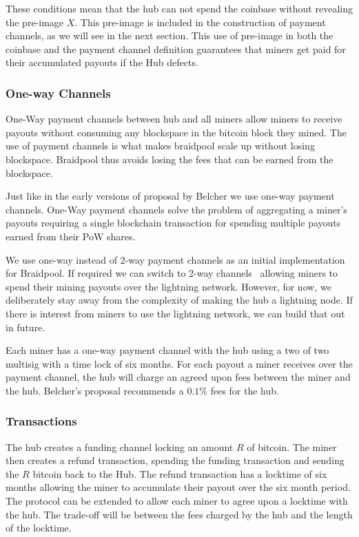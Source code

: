 \documentclass{article}
\begin{document}
These conditions mean that the hub can not spend the coinbase without
revealing the pre-image $X$. This pre-image is included in the
construction of payment channels, as we will see in the next
section. This use of pre-image in both the coinbase and the payment
channel definition guarantees that miners get paid for their
accumulated payouts if the Hub defects.

\subsubsection{One-way Channels}

One-Way payment channels between hub and all miners allow miners to
receive payouts without consuming any blockspace in the bitcoin block
they mined. The use of payment channels is what makes braidpool scale
up without losing blockspace. Braidpool thus avoids losing the fees
that can be earned from the blockspace.

Just like in the early versions of proposal by Belcher we use one-way
payment channels. One-Way payment channels solve the problem of
aggregating a miner's payouts requiring a single blockchain
transaction for spending multiple payouts earned from their PoW
shares.

We use one-way instead of 2-way payment channels as an initial
implementation for Braidpool. If required we can switch to 2-way
channels~\cite{poon2016bitcoin} allowing miners to spend their mining
payouts over the lightning network. However, for now, we deliberately
stay away from the complexity of making the hub a lightning node. If
there is interest from miners to use the lightning network, we can
build that out in future.

Each miner has a one-way payment channel with the hub using a two of
two multisig with a time lock of six months. For each payout a miner
receives over the payment channel, the hub will charge an agreed upon
fees between the miner and the hub. Belcher's proposal recommends a
$0.1\%$ fees for the hub.

\subsubsection{Transactions}

The hub creates a funding channel locking an amount $R$ of
bitcoin. The miner then creates a refund transaction, spending the
funding transaction and sending the $R$ bitcoin back to the Hub. The
refund transaction has a locktime of six months allowing the miner to
accumulate their payout over the six month period. The protocol can be
extended to allow each miner to agree upon a locktime with the
hub. The trade-off will be between the fees charged by the hub and the
length of the locktime.
\end{document}
